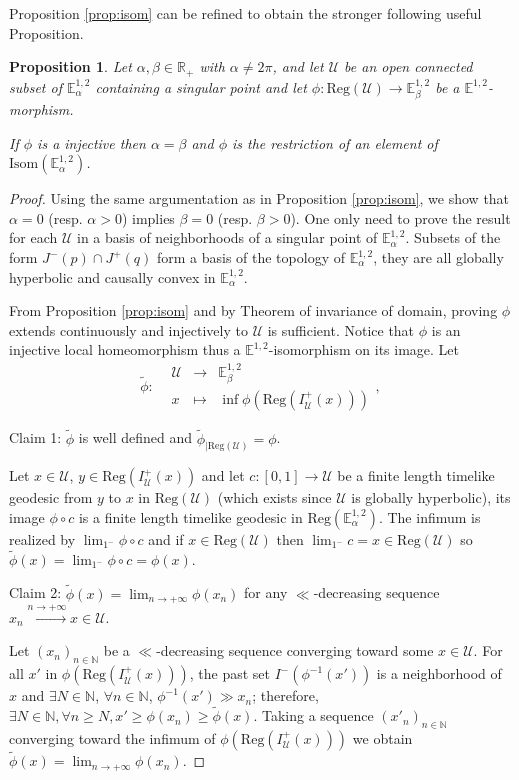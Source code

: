 \documentclass[a4paper,12pt]{article}
\def\U{\mathcal U}
\def\isom{Isom}
\def\R{\mathbb{R}}
\def\E{\mathbf E}
\def\N{\mathbb N}
\def\E{\mathbb{E}}
\newcommand{\mass}[1]{{\mathbb E}^{1,2}_{#1}}
\def\isom{\mathrm{Isom}}
\def\Reg{\mathrm{Reg}}
\def\reg{\Reg}
\newcommand{\fonction}[5]{\displaystyle#1:\begin{array}{l|rcl}
& \displaystyle #2 & \longrightarrow & \displaystyle #3 \\
    & \displaystyle #4 & \longmapsto & \displaystyle #5 \end{array}}
\newtheorem{propou}[lemou]{Proposition}
\begin{document}
Proposition \ref{prop:isom} can be refined to obtain the stronger following useful Proposition.
\begin{propou}\label{btzprop:isom_strong}\label{prop:isom_strong}
Let $\alpha,\beta\in \R_+$  with $\alpha\neq 2\pi$, and let $\U$ be an open connected
	  subset of $\E^{1,2}_\alpha$ containing a singular point
	  and let $\phi:\reg(\U)\rightarrow \E^{1,2}_\beta$ be a $\mass{}$-morphism. 
	  
	 If $\phi$ is a injective then $\alpha=\beta$ and  
	  $\phi$ is the restriction of an element of $\isom(\E^{1,2}_\alpha)$. 
\end{propou}


\begin{proof} Using the same argumentation as in Proposition \ref{prop:isom}, we show that $\alpha=0$ (resp. $\alpha>0$) implies $\beta=0$ (resp. $\beta>0$). One only need to prove the result for each $\U$ in a basis of neighborhoods of a singular point of $\mass{\alpha}$. Subsets of the form $J^-(p)\cap J^+(q)$ form a basis of the topology of $\mass{\alpha}$, they are all globally hyperbolic and causally convex in $\mass{\alpha}$. 

From Proposition \ref{prop:isom} and by Theorem of invariance of domain, proving $\phi$ extends continuously and injectively to $\U$ is sufficient. 
Notice that $\phi$ is an injective local homeomorphism thus a $\mass{}$-isomorphism on its image.
Let  $$\fonction{\widetilde \phi}{\U}{\mass{\beta}}{x}{\inf \phi(\Reg(I^+_\U(x)))},$$
\item Claim 1: $\widetilde \phi$ is well defined and $\widetilde \phi_{|\Reg(\U)} = \phi$. 

Let $x\in \U$, $y \in \Reg(I^+_\U(x))$ and let $c: [0,1]\rightarrow \U$ be a finite length timelike geodesic from $y$ to $x$ in $\Reg(\U)$ (which exists since $\U$ is globally hyperbolic), its image $\phi\circ c$ is a finite length timelike geodesic in $\Reg(\mass{\alpha})$. The infimum is realized by $\lim_{1^-}\phi\circ c$ and if $x\in \Reg(\U)$ then $\lim_{1^-} c = x\in \Reg(\U)$ so  $\widetilde \phi(x)=\lim_{1^-}\phi\circ c = \phi(x)$.

\item  Claim 2: $\displaystyle \widetilde \phi(x) = \lim_{n\rightarrow +\infty} \phi(x_n)$ for any $\ll$-decreasing sequence $x_n\xrightarrow{n\rightarrow +\infty}x\in \U$.

Let $(x_n)_{n\in\N}$ be a $\ll$-decreasing sequence converging toward some $x\in \U$.  For all $x'$ in $\phi(\Reg(I^+_\U(x)))$, the past set $I^-(\phi^{-1}(x'))$ is a neighborhood of $x$ and $\exists N\in \N$,  $\forall n\in \N$, $\phi^{-1}(x')\gg x_n$; therefore,  $\exists N\in \N,\forall n\geq N,x'\geq \phi(x_n)\geq \widetilde \phi(x)$. Taking a sequence $(x'_n)_{n\in\N}$ converging toward the infimum of $\phi(\Reg(I^+_\U(x)))$ we obtain $\widetilde \phi(x) = \lim_{n\rightarrow +\infty} \phi(x_n)$.


\end{proof}
\end{document}
